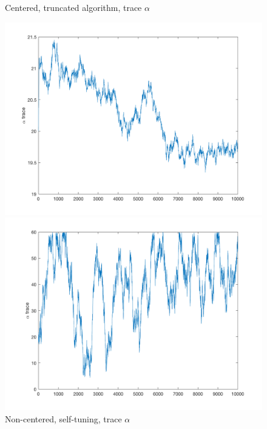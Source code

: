 \documentclass{siamart1116}
\begin{document}
\begin{figure}[H]
    \begin{minipage}{0.48\textwidth}
        \centering
        \caption{\label{fig:moon_centered_trace_alpha} Centered, truncated algorithm, trace $\alpha$}
        \includegraphics[width=\linewidth]{graphics/moons/centered_truncated/trace_alpha.png}
    \end{minipage} \hfill
    \begin{minipage}{0.48\textwidth}
        \centering
        \caption{\label{fig:moon_noncentered_trace_alpha} Non-centered, self-tuning, trace $\alpha$}
        \includegraphics[width=\linewidth]{graphics/moons/noncentered_selftuning/trace_alpha.png}
    \end{minipage}
\end{figure}
\end{document}
